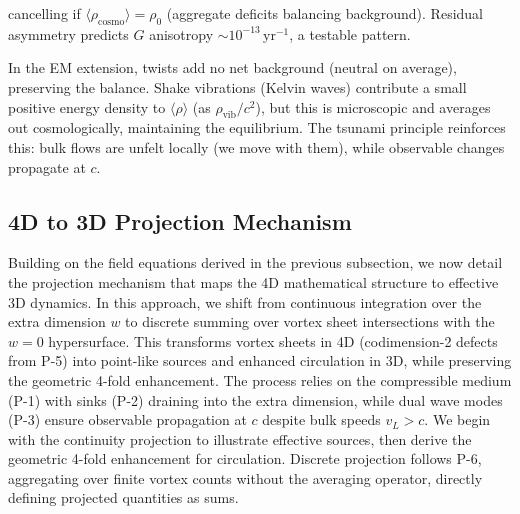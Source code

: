cancelling if $\langle \rho_\text{cosmo} \rangle = \rho_0$ (aggregate deficits balancing background). Residual asymmetry predicts $G$ anisotropy $\sim 10^{-13} \,\mathrm{yr}^{-1}$, a testable pattern.

In the EM extension, twists add no net background (neutral on average), preserving the balance. Shake vibrations (Kelvin waves) contribute a small positive energy density to $\langle \rho \rangle$ (as $\rho_{\text{vib}} / c^2$), but this is microscopic and averages out cosmologically, maintaining the equilibrium. The tsunami principle reinforces this: bulk flows are unfelt locally (we move with them), while observable changes propagate at $c$.

\medskip

\subsection{4D to 3D Projection Mechanism}

Building on the field equations derived in the previous subsection, we now detail the projection mechanism that maps the 4D mathematical structure to effective 3D dynamics. In this approach, we shift from continuous integration over the extra dimension $w$ to discrete summing over vortex sheet intersections with the $w=0$ hypersurface. This transforms vortex sheets in 4D (codimension-2 defects from P-5) into point-like sources and enhanced circulation in 3D, while preserving the geometric 4-fold enhancement. The process relies on the compressible medium (P-1) with sinks (P-2) draining into the extra dimension, while dual wave modes (P-3) ensure observable propagation at $c$ despite bulk speeds $v_L > c$. We begin with the continuity projection to illustrate effective sources, then derive the geometric 4-fold enhancement for circulation. Discrete projection follows P-6, aggregating over finite vortex counts without the averaging operator, directly defining projected quantities as sums.


